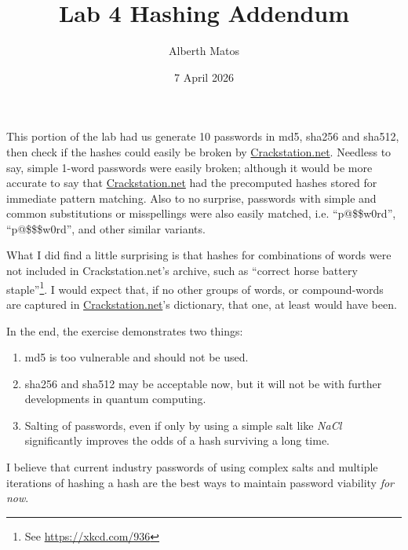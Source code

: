 \documentclass[12pt]{article}
\title{Lab 4 Hashing Addendum}
\author{Alberth Matos}
\date{7 April 2026}
\begin{document}
\maketitle
This portion of the lab had us generate 10 passwords in md5, sha256 and sha512, then check if the hashes could easily be broken by \url{Crackstation.net}. Needless to say, simple 1-word passwords were easily broken; although it would be more accurate to say that \url{Crackstation.net} had the precomputed hashes stored for immediate pattern matching. Also to no surprise, passwords with simple and common substitutions or misspellings were also easily matched, i.e. \enquote{p@\$\$w0rd}, \enquote{p@\$\$\$w0rd}, and other similar variants.

What I did find a little surprising is that hashes for combinations of words were not included in Crackstation.net's archive, such as \enquote{correct horse battery staple}\footnote{See \url{https://xkcd.com/936}}. I would expect that, if no other groups of words, or compound-words are captured in \url{Crackstation.net}'s dictionary, that one, at least would have been.

In the end, the exercise demonstrates two things:
\begin{enumerate}
\item md5 is too vulnerable and should not be used.
\item sha256 and sha512 may be acceptable now, but it will not be with further developments in quantum computing.
\item Salting of passwords, even if only by using a simple salt like \emph{NaCl} significantly improves the odds of a hash surviving a long time.
\end{enumerate}

I believe that current industry passwords of using complex salts and multiple iterations of hashing a hash are the best ways to maintain password viability \emph{for now}.
\end{document}
